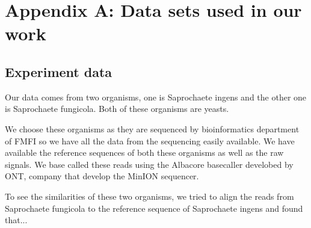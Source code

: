 \chapter*{Appendix A: Data sets used in our work}
\label{kap:apendA}

\section{Experiment data}

Our data comes from two organisms, one is Saprochaete ingens and the other one is
Saprochaete fungicola. Both of these organisms are yeasts.

We choose these organisms as they are sequenced by bioinformatics department of
FMFI so we have all the data from the sequencing easily available.
We have available the reference sequences of both these organisms as well as the
raw signals. We base called these reads using the Albacore basecaller develobed by
ONT, company that develop the MinION sequencer.

To see the similarities of these two organisms, we tried to align the reads from
Saprochaete fungicola to the reference sequence of Saprochaete ingens and found
that...

